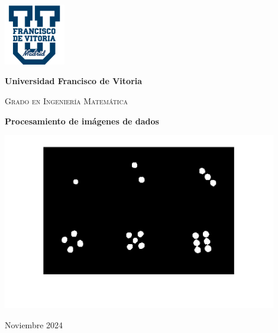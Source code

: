 
\begin{titlepage}
    \begin{center}
        \justify
        \vspace{1cm}
        
        \includegraphics[width=0.2\textwidth]{ImagenesLatex/ufv_logo}
        \vspace{1cm}
        
        \LARGE\textbf{Universidad Francisco de Vitoria}
        \vspace{0.5cm}
        
        \Large\textsc{Grado en Ingeniería Matemática}
        \vspace{1cm}
        
        
        \Huge\textbf{Procesamiento de imágenes de dados}
        \begin{center}
            \includegraphics[width=0.9\textwidth]{ImagenesLatex/pips.jpg}
        \end{center}

        \Large\textmd{Noviembre 2024}
        \vfill
        
    \end{center}
\end{titlepage}
